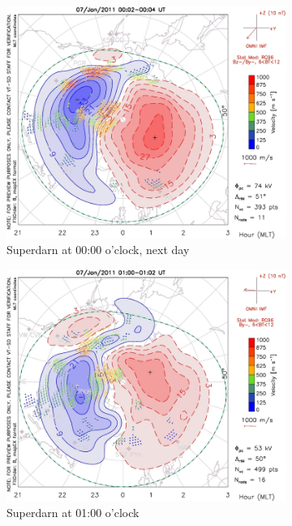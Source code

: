 \documentclass[10pt,a4paper]{article}
\begin{document}
\begin{figure}[h]
\begin{subfigure}{0.3\textwidth}
	\includegraphics[width=\textwidth]{Superdarn7.jpg}
	\caption{ Superdarn at 00:00 o'clock, next day \label{Super_00}}
\end{subfigure}
\begin{subfigure}{0.3\textwidth}
\centering
	\includegraphics[width=\textwidth]{Superdarn8.jpg}
	\caption{ Superdarn at 01:00 o'clock \label{Super_01}}
\end{subfigure}
\begin{subfigure}{0.3\textwidth}
\centering

\end{subfigure}
\end{figure}
\end{document}
